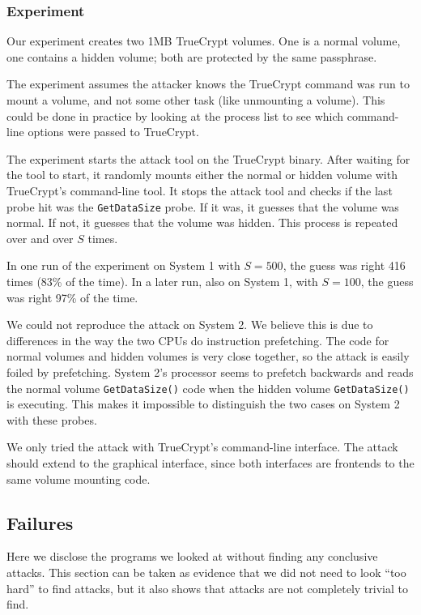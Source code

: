 \documentclass[letterpaper,twocolumn,10pt]{article}
\begin{document}
\subsubsection{Experiment}

Our experiment creates two 1MB TrueCrypt volumes. One is a normal volume, one
contains a hidden volume; both are protected by the same passphrase.

The experiment assumes the attacker knows the TrueCrypt command was run to mount
a volume, and not some other task (like unmounting a volume). This could be done
in practice by looking at the process list to see which command-line options
were passed to TrueCrypt.

The experiment starts the attack tool on the TrueCrypt binary. After waiting for
the tool to start, it randomly mounts either the normal or hidden volume with
TrueCrypt's command-line tool. It stops the attack tool and checks if the last
probe hit was the \texttt{GetDataSize} probe. If it was, it guesses that the
volume was normal. If not, it guesses that the volume was hidden. This process
is repeated over and over $S$ times.

In one run of the experiment on System 1 with
$S=500$, the guess was right 416 times (83\% of the time). In a later
run, also on System 1, with $S=100$, the guess was
right 97\% of the time.

We could not reproduce the attack on System 2. We believe this is due to
differences in the way the two CPUs do instruction prefetching. The code for
normal volumes and hidden volumes is very close together, so the attack is
easily foiled by prefetching. System 2's processor seems to prefetch backwards
and reads the normal volume \texttt{GetDataSize()} code when the hidden volume
\texttt{GetDataSize()} is executing. This makes it impossible to distinguish the
two cases on System 2 with these probes.

We only tried the attack with TrueCrypt's command-line interface. The attack
should extend to the graphical interface, since both interfaces are frontends to
the same volume mounting code. 

\subsection{Failures}
\label{sec:failures}

Here we disclose the programs we looked at without finding any conclusive
attacks. This section can be taken as evidence that we did not need to look
``too hard'' to find attacks, but it also shows that attacks are not completely
trivial to find.
\end{document}
